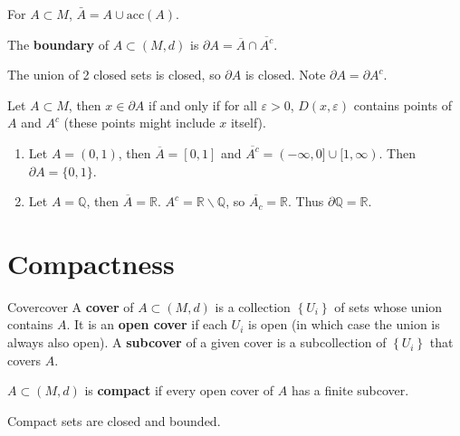 \documentclass[10pt]{report}
\begin{document}
\begin{prop}
	For $A \subset M$, $\bar{A}=A \cup \text{acc}(A)$.
\end{prop}

\begin{defn}[]
	The \textbf{boundary} of $A \subset (M,d)$ is $\partial A = \overline{A}\cap \overline{A^c}$.
\end{defn}
The union of 2 closed sets is closed, so $\partial A$ is closed. Note $\partial A = \partial A^c $.

\begin{prop}
	Let $A \subset M$, then $x \in \partial A$ if and only if for all $\varepsilon>0$, $D(x,\varepsilon)$ contains points of $A$ and $A^c$ (these points might include $x$ itself).
\end{prop}

\begin{ex}[]
	\begin{enumerate}
		\item Let $A=(0,1)$, then $\overline{A}=[0,1]$ and $\overline{A^c} =(-\infty,0] \cup[1,\infty)$. Then $\partial A = \{0,1\}$.
		\item Let $A=\mathbb{Q}$, then $\overline{A}=\mathbb{R}$. $A^c = \mathbb{R}\backslash \mathbb{Q}$, so $\overline{A_c} = \mathbb{R}$. Thus $\partial \mathbb{Q}=\mathbb{R}$.
	\end{enumerate}
\end{ex}


\section{Compactness}

\begin{defn}{Cover}{cover}
	A \textbf{cover} of $A \subset (M,d)$ is a collection $\left\{ U_i \right\}$ of sets whose union contains $A$. It is an \textbf{open cover} if each $U_i$ is open (in which case the union is always also open). A \textbf{subcover} of a given cover is a subcollection of $\left\{ U_i \right\}$ that covers $A$.
\end{defn}

\begin{defn}[]
	$A \subset (M,d)$ is \textbf{compact} if every open cover of $A$ has a finite subcover.
\end{defn}

\begin{prop}
Compact sets are closed and bounded.
\end{prop}
\end{document}
